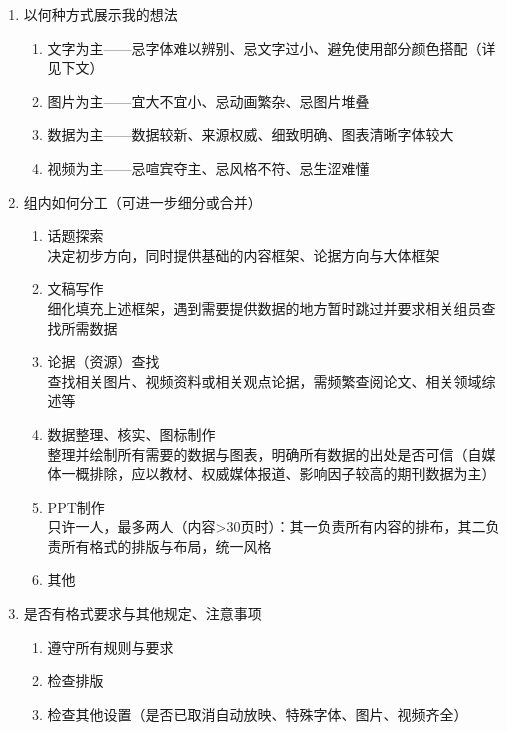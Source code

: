 \begin{enumerate}
\begin{enumerate}
          \end{enumerate}
    \item 以何种方式展示我的想法
          \begin{enumerate}
              \item 文字为主——忌字体难以辨别、忌文字过小、避免使用部分颜色搭配（详见下文）
              \item 图片为主——宜大不宜小、忌动画繁杂、忌图片堆叠
              \item 数据为主——数据较新、来源权威、细致明确、图表清晰字体较大
              \item 视频为主——忌喧宾夺主、忌风格不符、忌生涩难懂
          \end{enumerate}
          \pagebreak[3]
    \item 组内如何分工（可进一步细分或合并）
          \begin{enumerate}
              \item 话题探索\\
                    决定初步方向，同时提供基础的内容框架、论据方向与大体框架
              \item 文稿写作\\
                    细化填充上述框架，遇到需要提供数据的地方暂时跳过并要求相关组员查找所需数据
              \item 论据（资源）查找\\
                    查找相关图片、视频资料或相关观点论据，需频繁查阅论文、相关领域综述等
              \item 数据整理、核实、图标制作\\
                    整理并绘制所有需要的数据与图表，明确所有数据的出处是否可信（自媒体一概排除，应以教材、权威媒体报道、影响因子较高的期刊数据为主）
              \item PPT制作\\
                    只许一人，最多两人（内容>30页时）：其一负责所有内容的排布，其二负责所有格式的排版与布局，统一风格
              \item 其他
          \end{enumerate}
    \item 是否有格式要求与其他规定、注意事项
          \begin{enumerate}
              \item 遵守所有规则与要求
              \item 检查排版
              \item 检查其他设置（是否已取消自动放映、特殊字体、图片、视频齐全）
          \end{enumerate}
\end{enumerate}

